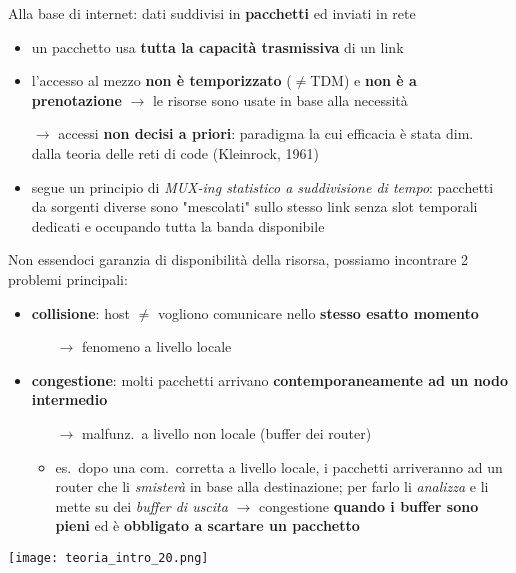 Alla base di internet: dati suddivisi in \textbf{pacchetti} ed inviati in rete
\begin{itemize}
  \item un pacchetto usa \textbf{tutta la capacit\`a trasmissiva} di un link
  \item l'accesso al mezzo \textbf{non \`e temporizzato} ($\neq$TDM) e \textbf{non \`e a prenotazione} $\rightarrow$ le risorse sono usate in base alla necessit\`a
  \item[$\rightarrow$] accessi \textbf{non decisi a priori}: paradigma la cui efficacia \`e stata dim.~ dalla teoria delle reti di code (Kleinrock, 1961)
  \item segue un principio di \textit{MUX-ing statistico a suddivisione di tempo}: pacchetti da sorgenti diverse sono "mescolati" sullo stesso link senza slot temporali dedicati e occupando tutta la banda disponibile
\end{itemize}

Non essendoci garanzia di disponibilit\`a della risorsa, possiamo incontrare 2 problemi principali:\\

\noindent\begin{minipage}[c]{.6\textwidth}
\begin{itemize}
  \item \textbf{collisione}: host $\neq$ vogliono comunicare nello \textbf{stesso esatto momento}
    \begin{itemize}
      \item[$\rightarrow$] fenomeno a livello locale
  \end{itemize}
  \item \textbf{congestione}: molti pacchetti arrivano \textbf{contemporaneamente ad un nodo intermedio}
    \begin{itemize}
      \item[$\rightarrow$] malfunz.~a livello non locale (buffer dei router)
      \item es.~dopo una com.~corretta a livello locale, i pacchetti arriveranno ad un router che li \textit{smister\`a} in base alla destinazione; per farlo li \textit{analizza} e li mette su dei \textit{buffer di uscita} $\rightarrow$ congestione \textbf{quando i buffer sono pieni} ed \`e \textbf{obbligato a scartare un pacchetto}
    \end{itemize}
\end{itemize}
\end{minipage}\hfill
\begin{minipage}[c]{.35\textwidth}
\texttt{[image: teoria\_intro\_20.png]}
\end{minipage}

